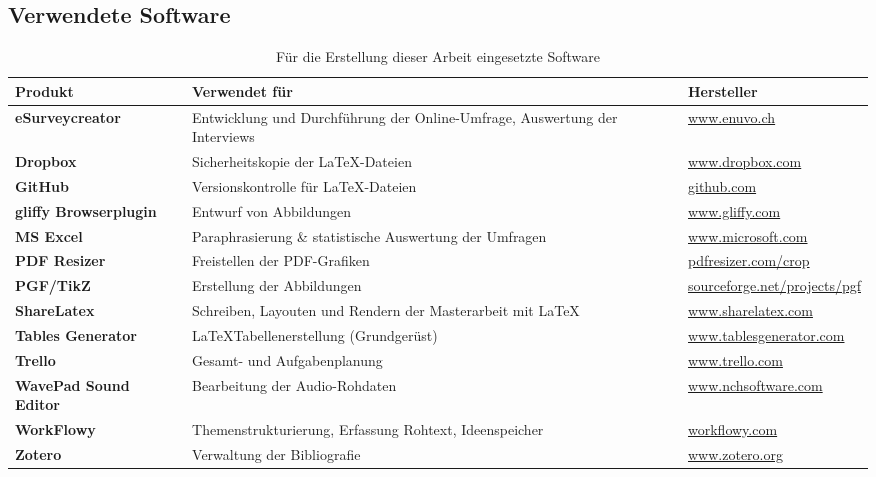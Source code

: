 \documentclass[main.tex]{subfiles}
\begin{document}
\subsection*{Verwendete Software}


\begin{table}[H]
\caption{Für die Erstellung dieser Arbeit eingesetzte Software}
\label{used-sw}


\begin{tabular}{ |p{4cm}|p{7.5cm}|p{4.5cm}| }


\hline
\rowcolor[HTML]{C0C0C0} 
\textbf{Produkt} & \textbf{Verwendet für} & \textbf{Hersteller}\\ 
\hline


\textbf{eSurveycreator} & Entwicklung und Durchführung der Online-Umfrage, \newline Auswertung der Interviews & \url{www.enuvo.ch}\\ \hline
\textbf{Dropbox} & Sicherheitskopie der \LaTeX  -Dateien & \url{www.dropbox.com} \\ \hline
\textbf{GitHub} & Versionskontrolle für \LaTeX  -Dateien & \url{github.com} \\ \hline
\textbf{gliffy Browserplugin} & Entwurf von Abbildungen & \url{www.gliffy.com} \\ \hline
\textbf{MS Excel} & Paraphrasierung \& statistische Auswertung der Umfragen & \url{www.microsoft.com} \\ \hline
\textbf{PDF Resizer} & Freistellen der PDF-Grafiken & \url{pdfresizer.com/crop} \\ \hline
\textbf{PGF/TikZ} & Erstellung der Abbildungen & \url{sourceforge.net/projects/pgf} \\ \hline
\textbf{ShareLatex} & Schreiben, Layouten und Rendern der Masterarbeit mit \LaTeX & \url{www.sharelatex.com} \\ \hline
\textbf{Tables Generator} & \LaTeX Tabellenerstellung (Grundgerüst)  & \url{www.tablesgenerator.com} \\ \hline
\textbf{Trello} & Gesamt- und Aufgabenplanung  & \url{www.trello.com} \\ \hline
\textbf{WavePad Sound Editor} & Bearbeitung der Audio-Rohdaten & \url{www.nchsoftware.com} \\ \hline
\textbf{WorkFlowy} & Themenstrukturierung, Erfassung Rohtext, Ideenspeicher & \url{workflowy.com} \\ \hline
\textbf{Zotero} & Verwaltung der Bibliografie & \url{www.zotero.org} \\ \hline

\end{tabular}
\end{table}

\listoftodos
\end{document}
